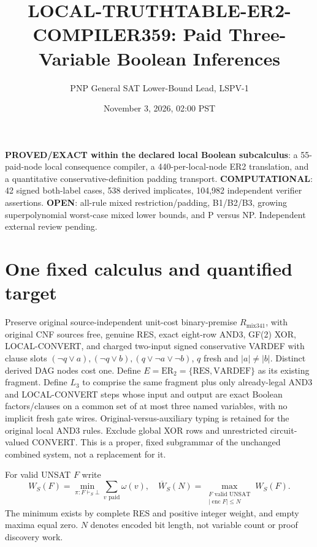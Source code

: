 \documentclass[11pt]{article}
\title{LOCAL-TRUTHTABLE-ER2-COMPILER359: Paid Three-Variable Boolean Inferences}
\author{PNP General SAT Lower-Bound Lead, LSPV-1}
\date{November 3, 2026, 02:00 PST}
\begin{document}
\maketitle
\noindent\textbf{PROVED/EXACT within the declared local Boolean subcalculus}: a 55-paid-node local consequence compiler, a 440-per-local-node ER2 translation, and a quantitative conservative-definition padding transport. \textbf{COMPUTATIONAL}: 42 signed both-label cases, 538 derived implicates, 104,982 independent verifier assertions. \textbf{OPEN}: all-rule mixed restriction/padding, B1/B2/B3, growing superpolynomial worst-case mixed lower bounds, and P versus NP. Independent external review pending.

\section*{One fixed calculus and quantified target}
Preserve original source-independent unit-cost binary-premise \(R_{\mathrm{mix341}}\), with original CNF sources free, genuine RES, exact eight-row AND3, GF(2) XOR, LOCAL-CONVERT, and charged two-input signed conservative VARDEF with clause slots \((\neg q\vee a),(\neg q\vee b),(q\vee\neg a\vee\neg b)\), \(q\) fresh and \(|a|\ne|b|\). Distinct derived DAG nodes cost one. Define \(E=\mathrm{ER}_2=\{\mathrm{RES},\mathrm{VARDEF}\}\) as its existing fragment. Define \(L_3\) to comprise the same fragment plus only already-legal AND3 and LOCAL-CONVERT steps whose input and output are exact Boolean factors/clauses on a common set of at most three named variables, with no implicit fresh gate wires. Original-versus-auxiliary typing is retained for the original local AND3 rules. Exclude global XOR rows and unrestricted circuit-valued CONVERT. This is a proper, fixed subgrammar of the unchanged combined system, not a replacement for it.

For valid UNSAT \(F\) write
\[
W_S(F)=\min_{\pi:F\vdash_S\bot}\sum_{v\text{ paid}}\omega(v),\quad
\overline W_S(N)=\max_{\substack{F\text{ valid UNSAT}\\|\operatorname{enc}F|\le N}}W_S(F).
\]
The minimum exists by complete RES and positive integer weight, and empty maxima equal zero. \(N\) denotes encoded bit length, not variable count or proof discovery work.
\end{document}
